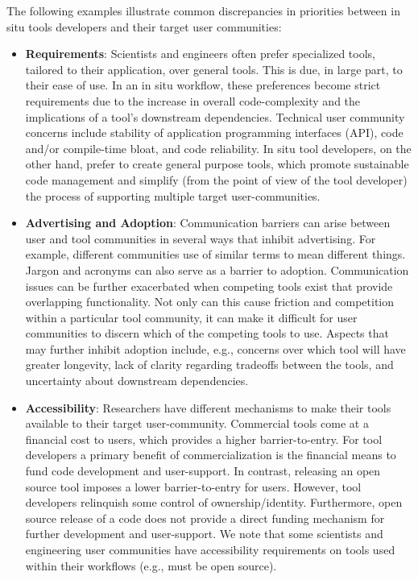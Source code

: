 The following examples illustrate common discrepancies in priorities between in situ tools developers and their target user communities:
\begin{itemize}
\item \textbf{Requirements}: Scientists and engineers often prefer specialized tools, tailored to their application, over general tools.  This is due, in large part, to their ease of use. In an in situ workflow,  these preferences become strict requirements due to the increase in overall code-complexity and the implications of a tool’s downstream dependencies. Technical user community concerns include stability of application programming interfaces (API), code and/or compile-time bloat, and code reliability. In situ tool developers, on the other hand, prefer to create general purpose tools, which promote sustainable code management and simplify (from the point of view of the tool developer) the process of supporting multiple target user-communities.

\item \textbf{Advertising and Adoption}: Communication barriers can arise between user and tool communities in several ways that inhibit advertising. For example, different communities use of similar terms to mean different things.  Jargon and acronyms can also serve as a barrier to adoption.   Communication issues can be further exacerbated when competing tools exist that provide overlapping  functionality. Not only can this cause friction and competition within a particular tool community, it can make it difficult for user communities to discern which of the competing tools to use.  Aspects that may further inhibit adoption include, e.g., concerns over which tool will have greater longevity, lack of clarity regarding tradeoffs between the tools, and uncertainty about downstream dependencies.  

\item \textbf{Accessibility}: Researchers have different mechanisms to make their tools available to their target user-community.  Commercial tools come at a financial cost to users, which provides a higher barrier-to-entry.  For tool developers a primary benefit of commercialization is the financial means to fund code development and user-support. In contrast, releasing an open source tool imposes a lower barrier-to-entry for users.  However, tool developers relinquish some control of ownership/identity. Furthermore, open source release of a code does not provide a direct funding mechanism for further development and user-support. We note that some scientists and engineering user communities have accessibility requirements on tools used within their workflows (e.g., must be open source).
\end{itemize}

